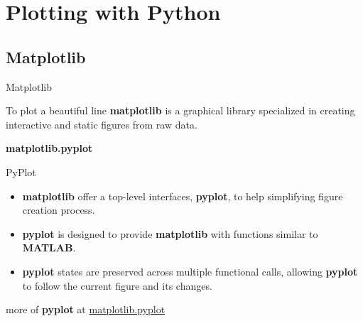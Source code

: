 \documentclass{beamer}
\begin{document}
    \section{Plotting with Python}
    \subsection{Matplotlib}
    \begin{frame}[fragile]{Matplotlib}
        \begin{block}{To plot a beautiful line}
            \textbf{matplotlib} is a graphical library specialized in creating interactive and static figures from raw data. 
        \end{block}
        \pause
        \textbf{matplotlib.pyplot}
        \begin{block}{PyPlot}
            \begin{itemize}
                \item \textbf{matplotlib} offer a top-level interfaces, \textbf{pyplot}, to help simplifying figure creation process.
                \item \textbf{pyplot} is designed to provide \textbf{matplotlib} with functions similar to \textbf{MATLAB}.
                \item \textbf{pyplot} states are preserved across multiple functional calls, allowing \textbf{pyplot} to follow the current figure and its changes.
            \end{itemize}
        \end{block}
        more of \textbf{pyplot} at \href{https://matplotlib.org/stable/api/_as_gen/matplotlib.pyplot.html}{matplotlib.pyplot}
    \end{frame}
\end{document}
